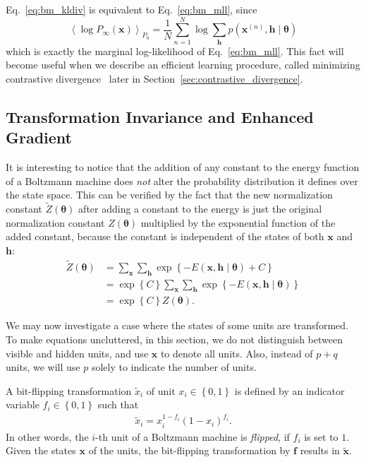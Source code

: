 \documentclass{now}
\newcommand{\vect}[1]{\mathbf{#1}}
\newcommand{\vects}[1]{\boldsymbol{#1}}
\newcommand{\vh}[0]{\vect{h}}
\newcommand{\vf}[0]{\vect{f}}
\newcommand{\vx}[0]{\vect{x}}
\newcommand{\TT}[0]{{\vects{\theta}}}
\begin{document}
Eq.~\eqref{eq:bm_kldiv} is equivalent to Eq.~\eqref{eq:bm_mll}, since
\[
\left< \log P_\infty(\vx) \right>_{P_0} = \frac{1}{N}
\sum_{n=1}^N \log \sum_{\vh} p(\vx^{(n)}, \vh \mid \TT)
\]
which is exactly the marginal log-likelihood of Eq.~\eqref{eq:bm_mll}. This fact
will become useful when we describe an efficient learning procedure, called
minimizing contrastive divergence~\citep{Hinton2002} later in
Section~\ref{sec:contrastive_divergence}.

\subsection{Transformation Invariance and Enhanced Gradient}
\label{sec:enhanced_grad}

It is interesting to notice that the addition of any constant to the energy
function of a Boltzmann machine does \textit{not} alter the probability
distribution it defines over the state space. This can be verified by the fact
that the new normalization constant $\tilde{Z}(\TT)$ after adding a constant to
the energy is just the original normalization constant $Z(\TT)$ multiplied by
the exponential function of the added constant, because the constant is
independent of the states of both $\vx$ and $\vh$:
\begin{align*}
    \tilde{Z}(\TT) &= \sum_\vx \sum_\vh \exp\left\{
    -E(\vx, \vh \mid \TT) + C \right\} \\
    &= \exp\left\{ C \right\} \sum_\vx \sum_\vh \exp\left\{
    -E(\vx, \vh \mid \TT) \right\} \\
    &= \exp\left\{ C \right\} Z(\TT).
\end{align*}

We may now investigate a case where the states of some units are transformed. To
make equations uncluttered, in this section, we do not distinguish between
visible and hidden units, and use $\vx$ to denote all units. Also, instead of
$p+q$ units, we will use $p$ solely to indicate the number of units.

A bit-flipping transformation $\tilde{x}_i$ of unit $x_i \in \left\{ 0,
1\right\}$ is defined by an indicator variable $f_i \in \left\{ 0, 1\right\}$
such that 
\begin{align*}
    \tilde{x}_i = x_i^{1 - f_i} \left( 1 - x_i\right)^{f_i}.
\end{align*}
In other words, the $i$-th unit of a Boltzmann machine is \textit{flipped}, if
$f_i$ is set to $1$. Given the states $\vx$ of the units, the bit-flipping
transformation by $\vf$ results in $\tilde{\vx}$.
\end{document}
